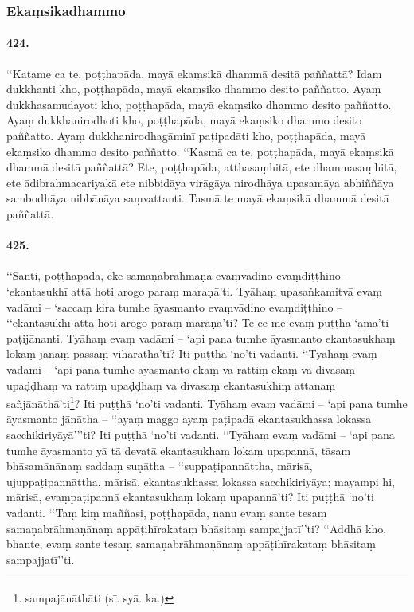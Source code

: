 \subsubsection{Ekaṃsikadhammo}

\paragraph{424.} ‘‘Katame ca te, poṭṭhapāda, mayā ekaṃsikā dhammā desitā paññattā? Idaṃ dukkhanti kho, poṭṭhapāda, mayā ekaṃsiko dhammo desito paññatto. Ayaṃ dukkhasamudayoti kho, poṭṭhapāda, mayā ekaṃsiko dhammo desito paññatto. Ayaṃ dukkhanirodhoti kho, poṭṭhapāda, mayā ekaṃsiko dhammo desito paññatto. Ayaṃ dukkhanirodhagāminī paṭipadāti kho, poṭṭhapāda, mayā ekaṃsiko dhammo desito paññatto. ‘‘Kasmā ca te, poṭṭhapāda, mayā ekaṃsikā dhammā desitā paññattā? Ete, poṭṭhapāda, atthasaṃhitā, ete dhammasaṃhitā, ete ādibrahmacariyakā ete nibbidāya virāgāya nirodhāya upasamāya abhiññāya sambodhāya nibbānāya saṃvattanti. Tasmā te mayā ekaṃsikā dhammā desitā paññattā.

\paragraph{425.} ‘‘Santi, poṭṭhapāda, eke samaṇabrāhmaṇā evaṃvādino evaṃdiṭṭhino – ‘ekantasukhī attā hoti arogo paraṃ maraṇā’ti. Tyāhaṃ upasaṅkamitvā evaṃ vadāmi – ‘saccaṃ kira tumhe āyasmanto evaṃvādino evaṃdiṭṭhino – ‘‘ekantasukhī attā hoti arogo paraṃ maraṇā’ti? Te ce me evaṃ puṭṭhā ‘āmā’ti paṭijānanti. Tyāhaṃ evaṃ vadāmi – ‘api pana tumhe āyasmanto ekantasukhaṃ lokaṃ jānaṃ passaṃ viharathā’ti? Iti puṭṭhā ‘no’ti vadanti. ‘‘Tyāhaṃ evaṃ vadāmi – ‘api pana tumhe āyasmanto ekaṃ vā rattiṃ ekaṃ vā divasaṃ upaḍḍhaṃ vā rattiṃ upaḍḍhaṃ vā divasaṃ ekantasukhiṃ attānaṃ sañjānāthā’ti\footnote{sampajānāthāti (sī. syā. ka.)}? Iti puṭṭhā ‘no’ti vadanti. Tyāhaṃ evaṃ vadāmi – ‘api pana tumhe āyasmanto jānātha – ‘‘ayaṃ maggo ayaṃ paṭipadā ekantasukhassa lokassa sacchikiriyāyā’’’ti? Iti puṭṭhā ‘no’ti vadanti. ‘‘Tyāhaṃ evaṃ vadāmi – ‘api pana tumhe āyasmanto yā tā devatā ekantasukhaṃ lokaṃ upapannā, tāsaṃ bhāsamānānaṃ saddaṃ suṇātha – ‘‘suppaṭipannāttha, mārisā, ujuppaṭipannāttha, mārisā, ekantasukhassa lokassa sacchikiriyāya; mayampi hi, mārisā, evaṃpaṭipannā ekantasukhaṃ lokaṃ upapannā’ti? Iti puṭṭhā ‘no’ti vadanti. ‘‘Taṃ kiṃ maññasi, poṭṭhapāda, nanu evaṃ sante tesaṃ samaṇabrāhmaṇānaṃ appāṭihīrakataṃ bhāsitaṃ sampajjatī’’ti? ‘‘Addhā kho, bhante, evaṃ sante tesaṃ samaṇabrāhmaṇānaṃ appāṭihīrakataṃ bhāsitaṃ sampajjatī’’ti.

